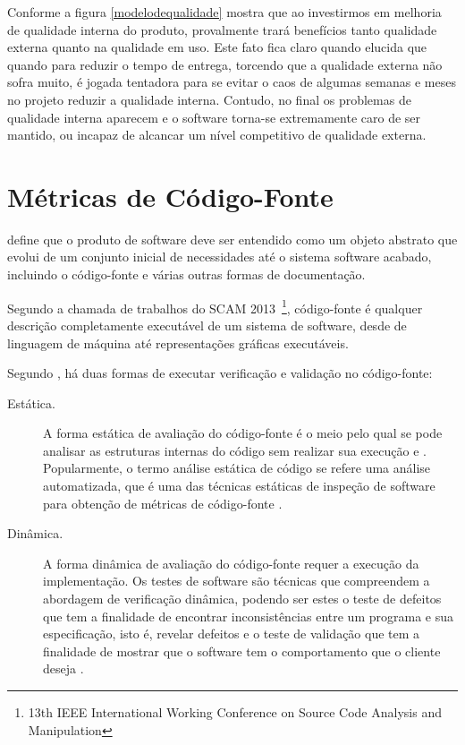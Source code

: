 		 Conforme a figura \ref{modelodequalidade} mostra que ao investirmos em melhoria de qualidade interna do produto, provalmente trará benefícios tanto qualidade externa quanto na qualidade em uso. Este fato fica claro quando  elucida que quando para reduzir o tempo de entrega, torcendo que a qualidade externa não sofra muito, é jogada tentadora para se evitar o caos de algumas semanas e meses no projeto reduzir a qualidade interna. Contudo, no final os problemas de qualidade interna aparecem e o software torna-se extremamente caro de ser mantido, ou incapaz de alcancar um nível competitivo de qualidade externa. 



	
	\section {Métricas de Código-Fonte}
	\label {Métricas de Código-Fonte}
	
	 define que o produto de software deve ser entendido como um objeto abstrato que evolui de um conjunto inicial de necessidades até o sistema software acabado, incluindo o código-fonte e várias outras formas de documentação.
	
	Segundo a chamada de trabalhos do SCAM 2013~\footnote{13th IEEE International Working Conference on Source Code Analysis and Manipulation}, código-fonte é  qualquer descrição completamente executável de um sistema de software, desde de linguagem de máquina até representações gráficas executáveis.
	

	Segundo , há duas formas de executar verificação e validação no código-fonte:
	
	\begin{description}
	
	\item[Estática.] A forma estática de avaliação do código-fonte é o meio pelo qual se pode analisar as estruturas internas do código sem realizar sua execução \cite{Wichmann95} e \cite{Nielson:1999}. Popularmente, o termo análise estática de código se refere uma análise automatizada, que é uma das técnicas estáticas de inspeção de software para obtenção de métricas de código-fonte \cite{Terra2008} \cite{Emanuelsson2008}.

	\item[Dinâmica.] A forma dinâmica de avaliação do código-fonte requer a execução da implementação. Os testes de software são técnicas que compreendem a abordagem de verificação dinâmica, podendo ser estes o teste de defeitos que tem a finalidade de encontrar inconsistências entre um programa e sua especificação, isto é, revelar defeitos e o teste de validação que tem a finalidade de mostrar que o software tem o comportamento que o cliente deseja \cite{Sommerville10}. 

	\end{description}

